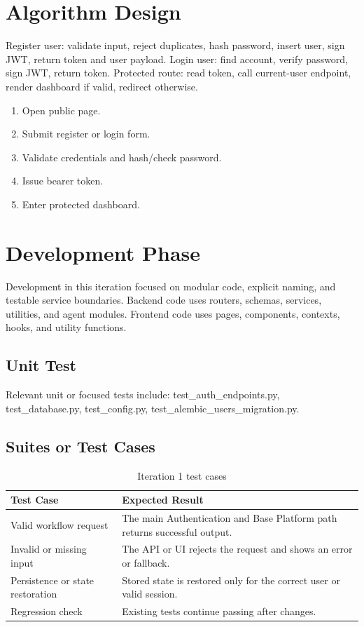 \documentclass[12pt,a4paper,oneside]{report}
\begin{document}
\section{Algorithm Design}
Register user: validate input, reject duplicates, hash password, insert user, sign JWT, return token and user payload. Login user: find account, verify password, sign JWT, return token. Protected route: read token, call current-user endpoint, render dashboard if valid, redirect otherwise.
\begin{enumerate}

\item Open public page.

\item Submit register or login form.

\item Validate credentials and hash/check password.

\item Issue bearer token.

\item Enter protected dashboard.

\end{enumerate}

\section{Development Phase}
Development in this iteration focused on modular code, explicit naming, and testable service boundaries. Backend code uses routers, schemas, services, utilities, and agent modules. Frontend code uses pages, components, contexts, hooks, and utility functions.

\subsection{Unit Test}
Relevant unit or focused tests include: test\_auth\_endpoints.py, test\_database.py, test\_config.py, test\_alembic\_users\_migration.py.

\subsection{Suites or Test Cases}
\begin{longtable}{p{}p{}}
\caption{Iteration 1 test cases}\\
\toprule
Test Case & Expected Result \\
\midrule

Valid workflow request & The main Authentication and Base Platform path returns successful output. \\

Invalid or missing input & The API or UI rejects the request and shows an error or fallback. \\
Persistence or state restoration & Stored state is restored only for the correct user or valid session. \\
Regression check & Existing tests continue passing after changes. \\
\bottomrule
\end{longtable}
\end{document}
